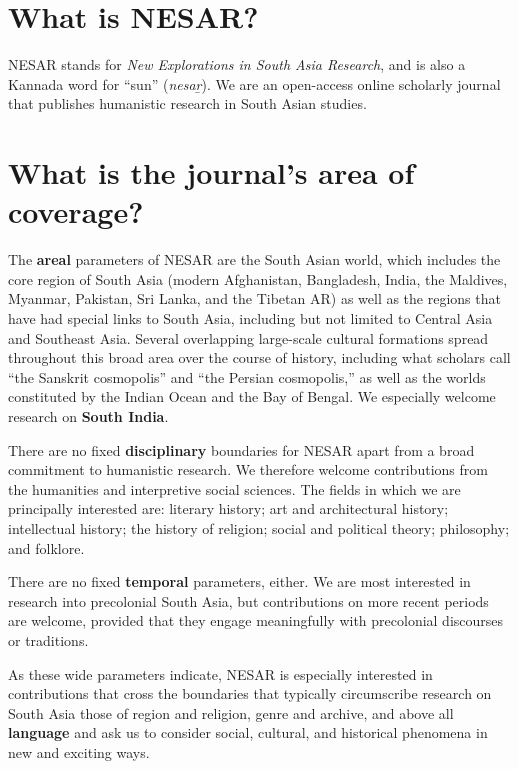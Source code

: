 \thispagestyle{firstpage}
\section{What is NESAR?}\label{dn1m0iwxqafc}
      NESAR stands for \emph{New Explorations in South Asia Research}, and is also a Kannada word for “sun” (\emph{nesaṟ}). We are an open-access online scholarly journal that publishes humanistic research in South Asian studies. 

\section{What is the journal’s area of coverage?}\label{jjge1v6cc0s}
      The \textbf{areal} parameters of NESAR are the South Asian world, which includes the core region of South Asia (modern Afghanistan, Bangladesh, India, the Maldives, Myanmar, Pakistan, Sri Lanka, and the Tibetan AR) as well as the regions that have had special links to South Asia, including but not limited to Central Asia and Southeast Asia. Several overlapping large-scale cultural formations spread throughout this broad area over the course of history, including what scholars call “the Sanskrit cosmopolis” and “the Persian cosmopolis,” as well as the worlds constituted by the Indian Ocean and the Bay of Bengal. We especially welcome research on \textbf{South India}.

There are no fixed \textbf{disciplinary} boundaries for NESAR apart from a broad commitment to humanistic research. We therefore welcome contributions from the humanities and interpretive social sciences. The fields in which we are principally interested are: literary history; art and architectural history; intellectual history; the history of religion; social and political theory; philosophy; and folklore.

There are no fixed \textbf{temporal} parameters, either. We are most interested in research into precolonial South Asia, but contributions on more recent periods are welcome, provided that they engage meaningfully with precolonial discourses or traditions.

As these wide parameters indicate, NESAR is especially interested in contributions that cross the boundaries that typically circumscribe research on South Asia \Dash those of region and religion, genre and archive, and above all \textbf{language} \Dash and ask us to consider social, cultural, and historical phenomena in new and exciting ways. 

